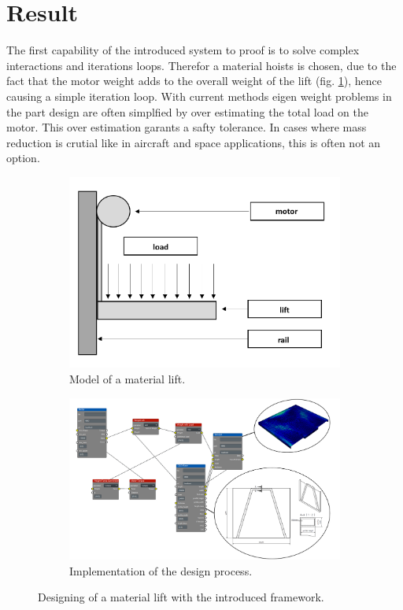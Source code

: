 \section{Result}

The first capability of the introduced system to proof is 
to solve complex interactions and iterations loops.
Therefor a material hoists is chosen, 
due to the fact that the motor weight adds 
to the overall weight of the lift (fig. \ref{pic:lift_model}), 
hence causing a simple iteration loop.
With current methods eigen weight problems in the part design are often simplfied 
by over estimating the total load on the motor.
This over estimation garants a safty tolerance.
In cases where mass reduction is crutial like in aircraft and space applications, this is often not an option.
\begin{figure}[h]
    \centering
    \begin{subfigure}[b]{0.45\textwidth}
        \centering
        \includegraphics[width=\textwidth]{pics/500Z_model.png}
        \caption{\label{pic:lift_model} Model of a material lift.}
    \end{subfigure}
    \hfill
    \begin{subfigure}[b]{0.5\textwidth}
        \centering
        \includegraphics[width=\textwidth]{pics/500Z_solution.png}
        \caption{\label{pic:lift_solu} Implementation of the design process.}
    \end{subfigure}
    \caption{\label{pic:lift} Designing of a material lift with the introduced framework.}
\end{figure}\\

